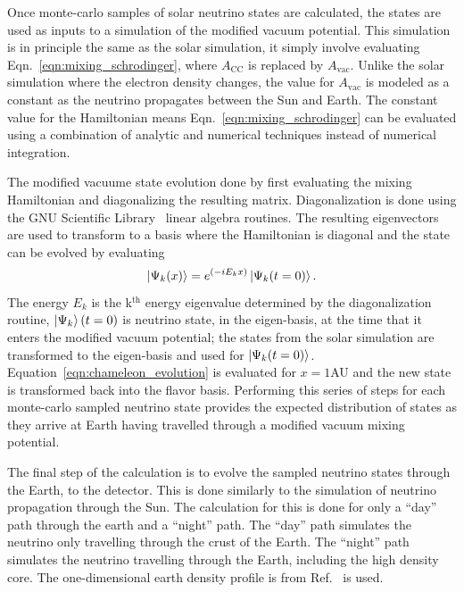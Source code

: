 Once  monte-carlo samples of solar neutrino states are calculated, the
states are used as inputs to a simulation of the modified vacuum potential.
This simulation is in principle the same as the solar simulation,
it simply involve evaluating Eqn.~\eqref{eqn:mixing_schrodinger}, where 
$A_{\mathrm{CC}}$ is replaced by $A_{\mathrm{vac}}$.
Unlike the solar simulation where the electron density changes,
the value for $A_{\mathrm{vac}}$ is modeled as a constant 
as the neutrino propagates between the Sun and Earth.
The constant value for the Hamiltonian means
Eqn.~\eqref{eqn:mixing_schrodinger} can be evaluated using
a combination of analytic and numerical techniques instead of numerical
integration.

The modified vacuume state evolution done by first evaluating the mixing
Hamiltonian and diagonalizing the resulting matrix.
Diagonalization is done using the GNU Scientific Library~\cite{gsl_ref}
linear algebra routines.
The resulting eigenvectors are used to transform to a basis where the
Hamiltonian is diagonal and the state can be evolved by evaluating
\begin{equation}
\ket{\Psi_{k}(x)} = e^{(-iE_{k}x)} \ket{\Psi_{k}(t=0)}\text{.}
\label{eqn:chameleon_evolution}
\end{equation}
The energy $E_{k}$ is the k$^{\mathrm{th}}$ energy eigenvalue determined by the
diagonalization routine, $\ket{\Psi_{k}}(t=0)$ is neutrino state, in the eigen-basis, at
the time that it enters the modified vacuum potential;
the states from the solar simulation are transformed to the eigen-basis
and used for $\ket{\Psi_{k}(t=0)}$.
Equation~\eqref{eqn:chameleon_evolution} is evaluated for $x=1$AU
and the new state is transformed back into the flavor basis.
Performing this series of steps for each monte-carlo sampled neutrino
state provides the expected distribution of states as they arrive at Earth
having travelled through a modified vacuum mixing potential.

The final step of the calculation is to evolve the sampled neutrino states through
the Earth, to the detector.
This is done similarly to the simulation of neutrino propagation through the
Sun.
The calculation for this is done for only a ``day'' path through the earth
and a ``night'' path. The ``day'' path simulates the neutrino only travelling
through the crust of the Earth. The ``night'' path simulates the neutrino
travelling through the Earth, including the high density core.
The one-dimensional earth density profile is from Ref.~\citep{PREM} is used.

